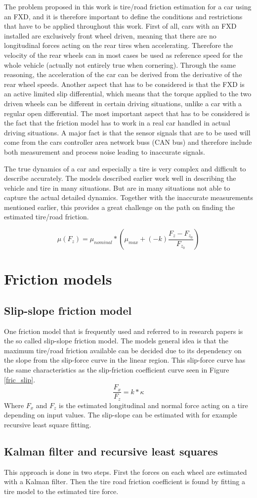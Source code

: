 The problem proposed in this work is tire/road friction estimation for a car using an FXD, and it is therefore important to define the conditions and restrictions that have to be applied throughout this work. First of all, cars with an FXD installed are exclusively front wheel driven, meaning that there are no longitudinal forces acting on the rear tires when accelerating. Therefore the velocity of the rear wheels can in most cases be used as reference speed for the whole vehicle (actually not entirely true when cornering). Through the same reasoning, the acceleration of the car can be derived from the derivative of the rear wheel speeds. Another aspect that has to be considered is that the FXD is an active limited slip differential, which means that the torque applied to the two driven wheels can be different in certain driving situations, unlike a car with a regular open differential. The most important aspect that has to be considered is the fact that the friction model has to work in a real car handled in actual driving situations. A major fact is that the sensor signals that are to be used  will come from the cars controller area network buss (CAN bus) and therefore include both measurement and process noise leading to inaccurate signals. 

The true dynamics of a car and especially a tire is very complex and difficult to describe accurately. The models described earlier work well in describing the vehicle and tire in many situations. But are in many situations not able to capture the actual detailed dynamics. Together with the inaccurate measurements mentioned earlier, this provides a great challenge on the path on finding the estimated tire/road friction. 

\begin{equation}
\mu(F_{z})=\mu_{nominal}*(\mu_{max} + (-k)\frac{F_{z} - F_{z_{0}}}{F_{z_{0}}})
\end{equation}

\section{Friction models}

\subsection{Slip-slope friction model}

One friction model that is frequently used and referred to in research papers is the so called slip-slope friction model. The models general idea is that the maximum tire/road friction available can be decided due to its dependency on the slope from the slip-force curve in the linear region. This slip-force curve has the same characteristics as the slip-friction coefficient curve seen in Figure \ref{fric_slip}. 
\begin{equation}
	\dfrac{F_{x}}{F_{z}} = k*\kappa
\end{equation}
Where $ F_{x} $ and $ F_{z} $ is the estimated longitudinal and normal force acting on a tire depending on input values. The slip-slope can be estimated with for example recursive least square fitting.


\subsection{Kalman filter and recursive least squares}
This approach is done in two steps. First the forces on each wheel are estimated with a Kalman filter. Then the tire road friction coefficient is found by fitting a tire model to the estimated tire force.